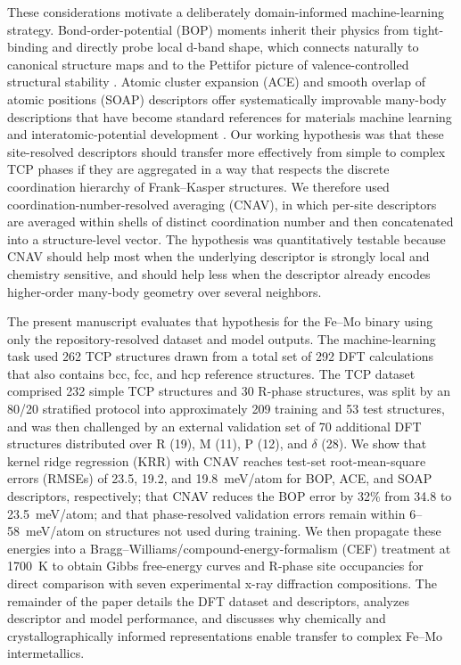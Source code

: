 \documentclass[prb,twocolumn,floatfix]{revtex4-2}
\begin{document}
These considerations motivate a deliberately domain-informed machine-learning strategy. Bond-order-potential (BOP) moments inherit their physics from tight-binding and directly probe local d-band shape, which connects naturally to canonical structure maps and to the Pettifor picture of valence-controlled structural stability \cite{Pettifor1995,Hammerschmidt2019BOPfox}. Atomic cluster expansion (ACE) and smooth overlap of atomic positions (SOAP) descriptors offer systematically improvable many-body descriptions that have become standard references for materials machine learning and interatomic-potential development \cite{Drautz2019ACE,Bartok2013SOAP,Himanen2020DScribe}. Our working hypothesis was that these site-resolved descriptors should transfer more effectively from simple to complex TCP phases if they are aggregated in a way that respects the discrete coordination hierarchy of Frank--Kasper structures. We therefore used coordination-number-resolved averaging (CNAV), in which per-site descriptors are averaged within shells of distinct coordination number and then concatenated into a structure-level vector. The hypothesis was quantitatively testable because CNAV should help most when the underlying descriptor is strongly local and chemistry sensitive, and should help less when the descriptor already encodes higher-order many-body geometry over several neighbors.

The present manuscript evaluates that hypothesis for the Fe--Mo binary using only the repository-resolved dataset and model outputs. The machine-learning task used 262 TCP structures drawn from a total set of 292 DFT calculations that also contains bcc, fcc, and hcp reference structures. The TCP dataset comprised 232 simple TCP structures and 30 R-phase structures, was split by an 80/20 stratified protocol into approximately 209 training and 53 test structures, and was then challenged by an external validation set of 70 additional DFT structures distributed over R (19), M (11), P (12), and $\delta$ (28). We show that kernel ridge regression (KRR) with CNAV reaches test-set root-mean-square errors (RMSEs) of 23.5, 19.2, and 19.8~meV/atom for BOP, ACE, and SOAP descriptors, respectively; that CNAV reduces the BOP error by 32\% from 34.8 to 23.5~meV/atom; and that phase-resolved validation errors remain within 6--58~meV/atom on structures not used during training. We then propagate these energies into a Bragg--Williams/compound-energy-formalism (CEF) treatment at 1700~K to obtain Gibbs free-energy curves and R-phase site occupancies for direct comparison with seven experimental x-ray diffraction compositions. The remainder of the paper details the DFT dataset and descriptors, analyzes descriptor and model performance, and discusses why chemically and crystallographically informed representations enable transfer to complex Fe--Mo intermetallics.
\end{document}
